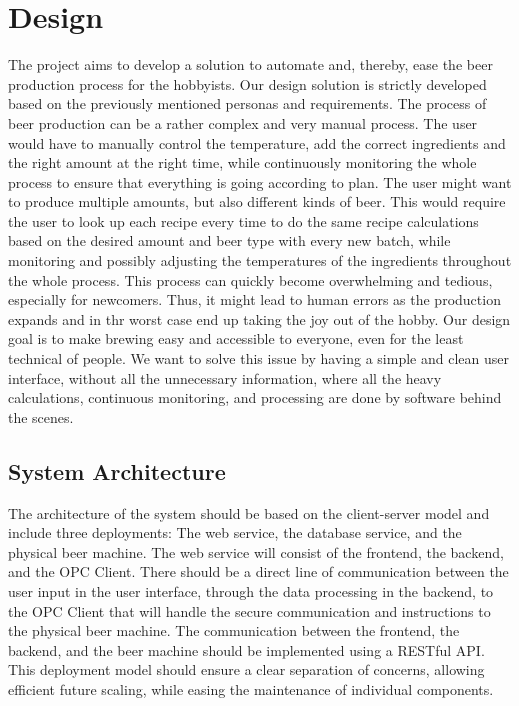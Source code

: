 \section{Design}
The project aims to develop a solution to automate and, thereby, ease the beer production process for the hobbyists. Our design solution is strictly developed based on the previously mentioned personas and requirements.\newline
The process of beer production can be a rather complex and very manual process. The user would have to manually control the temperature, add the correct ingredients and the right amount at the right time, while continuously monitoring the whole process to ensure that everything is going according to plan.\newline
The user might want to produce multiple amounts, but also different kinds of beer. This would require the user to look up each recipe every time to do the same recipe calculations based on the desired amount and beer type with every new batch, while monitoring and possibly adjusting the temperatures of the ingredients throughout the whole process.\newline
This process can quickly become overwhelming and tedious, especially for newcomers. Thus, it might lead to human errors as the production expands and in thr worst case end up taking the joy out of the hobby.\newline
Our design goal is to make brewing easy and accessible to everyone, even for the least technical of people. We want to solve this issue by having a simple and clean user interface, without all the unnecessary information, where all the heavy calculations, continuous monitoring, and processing are done by software behind the scenes.\newline

\subsection{System Architecture}
The architecture of the system should be based on the client-server model and include three deployments: The web service, the database service, and the physical beer machine. \newline
The web service will consist of the frontend, the backend, and the OPC Client. There should be a direct line of communication between the user input in the user interface, through the data processing in the backend, to the OPC Client that will handle the secure communication and instructions to the physical beer machine. \newline
The communication between the frontend, the backend, and the beer machine should be implemented using a RESTful API. \newline
This deployment model should ensure a clear separation of concerns, allowing efficient future scaling, while easing the maintenance of individual components.


